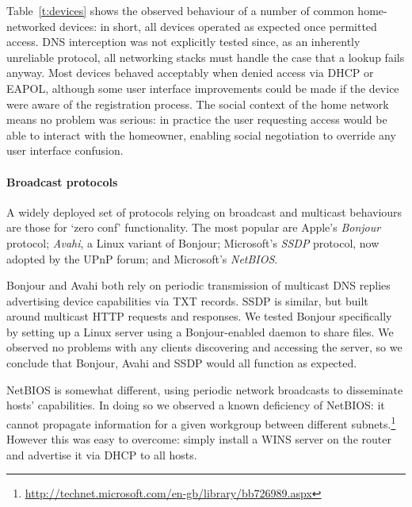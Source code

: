 Table~\ref{t:devices} shows the observed behaviour of a number of common
home-networked devices: in short, all devices operated as expected once
permitted access.  DNS interception was not explicitly tested since, as an
inherently unreliable protocol, all networking stacks must handle the case that
a lookup fails anyway.  Most devices behaved acceptably when denied access via
DHCP or EAPOL, although some user interface improvements could be made if the
device were aware of the registration process.  The social context of the home
network means no problem was serious: in practice the user requesting access
would be able to interact with the homeowner, enabling social negotiation to
override any user interface confusion. 


\paragraph{Broadcast protocols} A widely deployed set of protocols relying on
broadcast and multicast behaviours are those for `zero conf' functionality.  The
most popular are Apple's \emph{Bonjour} protocol; \emph{Avahi}, a Linux variant
of Bonjour; Microsoft's \emph{SSDP} protocol, now adopted by the UPnP forum; and
Microsoft's \emph{NetBIOS}.  

Bonjour and Avahi both rely on periodic transmission of multicast DNS replies
advertising device capabilities via TXT records.  SSDP is similar, but built
around multicast HTTP requests and responses.  We tested Bonjour specifically by
setting up a Linux server using a Bonjour-enabled daemon to share files.  We
observed no problems with any clients discovering and accessing the server, so
we conclude that Bonjour, Avahi and SSDP would all function as expected. 

NetBIOS is somewhat different, using periodic network broadcasts to disseminate
hosts' capabilities.  In doing so we observed a known deficiency of NetBIOS: it
cannot propagate information for a given workgroup between different
subnets.\footnote{\url{http://technet.microsoft.com/en-gb/library/bb726989.aspx}}
However this was easy to overcome: simply install a WINS server on the router
and advertise it via DHCP to all hosts.

